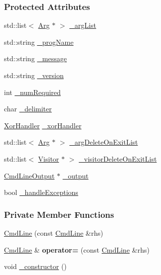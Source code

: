 \subsubsection*{Protected Attributes}
\begin{DoxyCompactItemize}
\item 
std\+::list$<$ \hyperlink{classTCLAP_1_1Arg}{Arg} $\ast$ $>$ \hyperlink{classTCLAP_1_1CmdLine_a4d70f73542d8184e077688bff3801baf}{\+\_\+arg\+List}
\item 
std\+::string \hyperlink{classTCLAP_1_1CmdLine_a8b856dadc54fa30d0dddba4588ef9344}{\+\_\+prog\+Name}
\item 
std\+::string \hyperlink{classTCLAP_1_1CmdLine_a3ccd2ae40f6eb97aebca3de9a02f10cf}{\+\_\+message}
\item 
std\+::string \hyperlink{classTCLAP_1_1CmdLine_a2b2b52fffed2dcb7df3cdfc582ec8fd1}{\+\_\+version}
\item 
int \hyperlink{classTCLAP_1_1CmdLine_a2285207b528d5fad18c82a2ee8155f37}{\+\_\+num\+Required}
\item 
char \hyperlink{classTCLAP_1_1CmdLine_a602e65692dc07ea872134f354026a54f}{\+\_\+delimiter}
\item 
\hyperlink{classTCLAP_1_1XorHandler}{Xor\+Handler} \hyperlink{classTCLAP_1_1CmdLine_a33846aa10c62ecd61640c93c16ac315d}{\+\_\+xor\+Handler}
\item 
std\+::list$<$ \hyperlink{classTCLAP_1_1Arg}{Arg} $\ast$ $>$ \hyperlink{classTCLAP_1_1CmdLine_af8d37fbf9d0b60b6acbd737af380f3e5}{\+\_\+arg\+Delete\+On\+Exit\+List}
\item 
std\+::list$<$ \hyperlink{classTCLAP_1_1Visitor}{Visitor} $\ast$ $>$ \hyperlink{classTCLAP_1_1CmdLine_a79b8a947f8100de977574b45b91117ac}{\+\_\+visitor\+Delete\+On\+Exit\+List}
\item 
\hyperlink{classTCLAP_1_1CmdLineOutput}{Cmd\+Line\+Output} $\ast$ \hyperlink{classTCLAP_1_1CmdLine_a5152bf4ef26217583a3bc708aa0ea83e}{\+\_\+output}
\item 
bool \hyperlink{classTCLAP_1_1CmdLine_a3609d0c13886053b367d1df80efbe67b}{\+\_\+handle\+Exceptions}
\end{DoxyCompactItemize}
\subsubsection*{Private Member Functions}
\begin{DoxyCompactItemize}
\item 
\hyperlink{classTCLAP_1_1CmdLine_ac6479892319106c49ec644bbc68a255e}{Cmd\+Line} (const \hyperlink{classTCLAP_1_1CmdLine}{Cmd\+Line} \&rhs)
\item 
\hyperlink{classTCLAP_1_1CmdLine}{Cmd\+Line} \& {\bfseries operator=} (const \hyperlink{classTCLAP_1_1CmdLine}{Cmd\+Line} \&rhs)\hypertarget{classTCLAP_1_1CmdLine_a46fd7d72c7a5cfeeacf5e9d0ff2cacf7}{}\label{classTCLAP_1_1CmdLine_a46fd7d72c7a5cfeeacf5e9d0ff2cacf7}

\item 
void \hyperlink{classTCLAP_1_1CmdLine_a955b1935c7b2e5118b2573bd2fbb958c}{\+\_\+constructor} ()
\end{DoxyCompactItemize}
